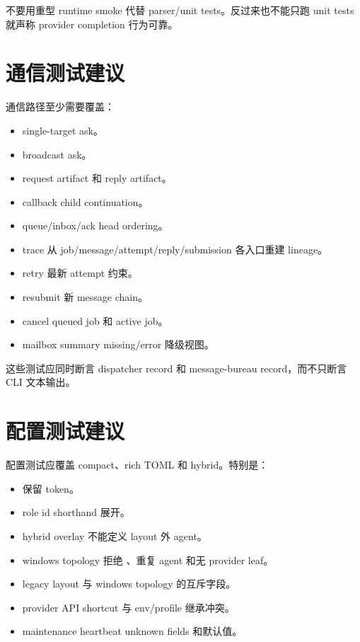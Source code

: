 不要用重型 runtime smoke 代替 parser/unit tests。反过来也不能只跑 unit tests 就声称 provider completion 行为可靠。

\section{通信测试建议}

通信路径至少需要覆盖：

\begin{itemize}
  \item single-target ask。
  \item broadcast ask。
  \item request artifact 和 reply artifact。
  \item callback child continuation。
  \item queue/inbox/ack head ordering。
  \item trace 从 job/message/attempt/reply/submission 各入口重建 lineage。
  \item retry 最新 attempt 约束。
  \item resubmit 新 message chain。
  \item cancel queued job 和 active job。
  \item mailbox summary missing/error 降级视图。
\end{itemize}

这些测试应同时断言 dispatcher record 和 message-bureau record，而不只断言 CLI 文本输出。

\section{配置测试建议}

配置测试应覆盖 compact、rich TOML 和 hybrid。特别是：

\begin{itemize}
  \item {} 保留 token。
  \item role id shorthand 展开。
  \item hybrid overlay 不能定义 layout 外 agent。
  \item windows topology 拒绝 、重复 agent 和无 provider leaf。
  \item legacy layout 与 windows topology 的互斥字段。
  \item provider API shortcut 与 env/profile 继承冲突。
  \item maintenance heartbeat unknown fields 和默认值。
\end{itemize}

